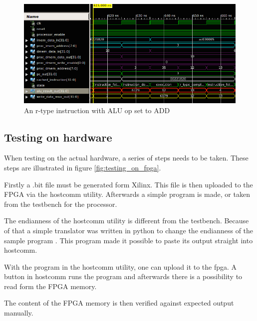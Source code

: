 \begin{figure}[ht!]
    \begin{center}
    \includegraphics[width=\textwidth]{assets/isim/r_type_cycle.png}
    \caption{An r-type instruction with ALU op set to ADD}
    \label{fig:r_type_cycle}
    \end{center}
\end{figure}

\subsection{Testing on hardware}

When testing on the actual hardware, a series of steps needs to be taken.
These steps are illustrated in figure \ref{fig:testing_on_fpga}.

Firstly a .bit file must be generated form Xilinx.
This file is then uploaded to the FPGA via the hostcomm utility.
Afterwards a simple program is made, or taken from the testbench for the processor.

The endianness of the hostcomm utility \cite{hostcomm} is different from the testbench.
Because of that a simple translator was written in python to change
the endianness of the sample program \cite{endian-change}.
This program made it possible to paste its output straight into hostcomm.

With the program in the hostcomm utility, one can upload it to the fpga.
A button in hostcomm runs the program and afterwards there is a possibility to read form the FPGA memory.

The content of the FPGA memory is then verified against expected output manually.

